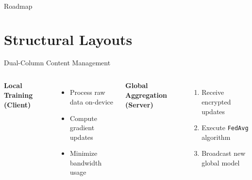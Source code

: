 
\begin{frame}{Roadmap}
    \tableofcontents
\end{frame}

\section{Structural Layouts}

\begin{frame}{Dual-Column Content Management}
    \begin{columns}[T]
        \textbf{Local Training (Client)}
        \begin{itemize}
            \item Process raw data on-device
            \item Compute gradient updates
            \item \alert{Minimize} bandwidth usage
        \end{itemize}

        \textbf{Global Aggregation (Server)}
        \begin{enumerate}
            \item Receive encrypted updates
            \item Execute \texttt{FedAvg} algorithm
            \item Broadcast new global model
        \end{enumerate}
    \end{columns}
\end{frame}

